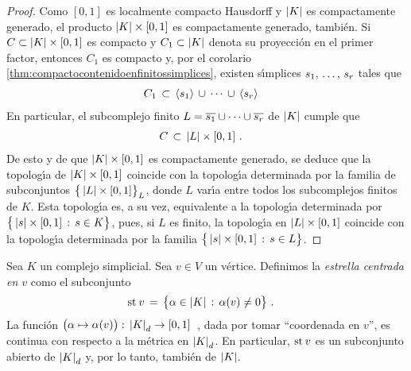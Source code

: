 \begin{proof}
	Como $[0,1]$ es localmente compacto Hausdorff y $\left|K\right|$ es
	compactamente generado, el producto $\left|K\right|\times [0,1]$ es
	compactamente generado, tambi\'{e}n. Si $C\subset\left|K\right|\times [0,1]$
	es compacto y $C_{1}\subset\left|K\right|$ denota su proyecci\'{o}n en
	el primer factor, entonces $C_{1}$ es compacto y, por el
	corolario \ref{thm:compactocontenidoenfinitossimplices}, existen
	s\'{\i}mplices $\lista{s}{r}$ tales que
	\begin{align*}
		C_{1} & \,\subset\,\langle s_{1}\rangle\,\cup\,\cdots\,\cup\,
					\langle s_{r}\rangle
	\end{align*}
	En particular, el subcomplejo finito
	$L=\overline{s_{1}}\cup\cdots\cup\overline{s_{r}}$ de $\left|K\right|$ cumple que
	\begin{align*}
		C & \,\subset\,\left|L\right|\times [0,1]
		\text{ .}
	\end{align*}
	De esto y de que $\left|K\right|\times [0,1]$ es compactamente generado,
	se deduce que la topolog\'{\i}a de $\left|K\right|\times [0,1]$ coincide
	con la topolog\'{\i}a determinada por la familia de subconjuntos
	$\big\{\left|L\right|\times [0,1]\big\}_{L}$, donde $L$ var\'{\i}a entre
	todos los subcomplejos finitos de $K$.
	Esta topolog\'{\i}a es, a su vez, equivalente a la topolog\'{\i}a
	determinada por $\big\{\left|s\right|\times [0,1]\,:\,s\in K\big\}$, pues,
	si $L$ es finito, la topolog\'{\i}a en $\left|L\right|\times [0,1]$
	coincide con la topolog\'{\i}a determinada por la familia
	$\big\{\left|s\right|\times [0,1]\,:\,s\in L\big\}$.
\end{proof}

Sea $K$ un complejo simplicial. Sea $v\in V$ un v\'{e}rtice. Definimos la
\emph{estrella centrada en $v$} como el subconjunto
\begin{align*}
	\mathrm{st}_{}\,v & \,=\,\big\{\alpha\in\left|K\right|\,:\,\alpha(v)\not=0\big\}
	\text{ .}
\end{align*}
%
La funci\'{o}n
\begin{math}
	\big(\alpha\mapsto\alpha(v)\big):\,\left|K\right|_{d}\rightarrow [0,1]
\end{math}~,
dada por tomar ``coordenada en $v$'', es continua con respecto a la
m\'{e}trica en $\left|K\right|_{d}$. En particular, $\mathrm{st}_{}\,v$ es un
subconjunto abierto de $\left|K\right|_{d}$ y, por lo tanto, tambi\'{e}n de
$\left|K\right|$.

